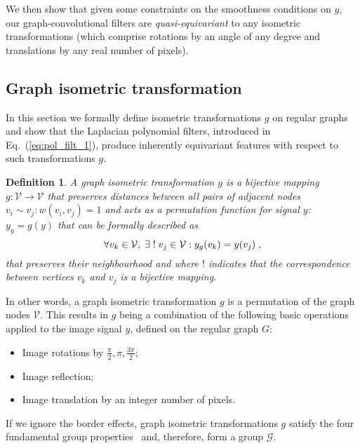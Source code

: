 \documentclass[10pt,journal,compsoc]{IEEEtran}
\begin{document}
	We then show that given some constraints on the smoothness conditions on $y$, our graph-convolutional filters are \emph{quasi-equivariant} to any isometric transformations (which comprise rotations by an angle of any degree and translations by any real number of pixels). 
	
	\subsection{Graph isometric transformation}
	\label{sec:90deg}
	
	In this section we formally define isometric transformations $g$ on regular graphs and show that the Laplacian polynomial filters, introduced in Eq.~(\ref{eq:pol_filt_1}), produce inherently equivariant features with respect to such transformations $g$.
	\newtheorem{mydef}{Definition}
	\begin{mydef}
		A graph isometric transformation $g$ is a bijective mapping $g : \mathcal{V} \rightarrow \mathcal{V}$ that preserves distances between all pairs of adjacent nodes $v_i \sim v_j: w(v_i, v_j)=1$ and acts as a permutation function for signal $y$: $y_g=g(y)$ that can be formally described as
		\begin{equation}
		\small
		\forall v_k \in \mathcal{V}, \; \exists \; !\; v_j \in \mathcal{V}: y_g(v_k) = y(v_j) \;,
		\label{eq:def}
		\end{equation} 
		\noindent
		that preserves their neighbourhood and where $!$ indicates that the correspondence between vertices $v_k$ and $v_j$ is a bijective mapping. 
		\label{def:graph_eq}
	\end{mydef}
	
	In other words, a graph isometric transformation $g$ is a permutation of the graph nodes $\mathcal{V}$. This results in $g$ being a combination of the following basic operations applied to the image signal $y$, defined on the regular graph $G$:
	\begin{itemize}
		\setlength\itemsep{0pt}
		\setlength{\parskip}{0pt}
		\item Image rotations by $ \frac{\pi}{2}, \pi, \frac{3\pi}{2} $;
		\item Image reflection;
		\item Image translation by an integer number of pixels.
	\end{itemize}
	If we ignore the border effects, graph isometric transformations $g$ satisfy the four fundamental group properties~\cite{bb:Herstein06} and, therefore, form a group $\mathcal{G}$.
	
\end{document}
